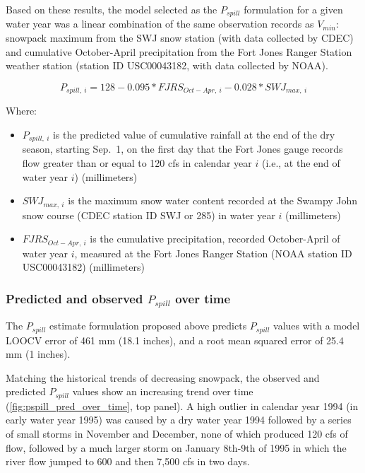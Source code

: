 \documentclass[hess, manuscript]{copernicus}
\providecommand{\tightlist}{%
  \setlength{\itemsep}{0pt}\setlength{\parskip}{0pt}}
\begin{document}
Based on these results, the model selected as the \(P_{spill}\)
formulation for a given water year was a linear combination of the same
observation records as \(V_{min}\): snowpack maximum from the SWJ snow
station (with data collected by CDEC) and cumulative October-April
precipitation from the Fort Jones Ranger Station weather station
(station ID USC00043182, with data collected by NOAA).

\begin{equation}
P_{spill,~i} = 128 -0.095 * FJRS_{Oct-Apr,~i} - 0.028* SWJ_{max,~i}
\end{equation}

Where:

\begin{itemize}
\tightlist
\item
  \(P_{spill,~i}\) is the predicted value of cumulative rainfall at the
  end of the dry season, starting Sep.~1, on the first day that the Fort
  Jones gauge records flow greater than or equal to 120 cfs in calendar
  year \(i\) (i.e., at the end of water year \(i\)) (millimeters)
\item
  \(SWJ_{max,~i}\) is the maximum snow water content recorded at the
  Swampy John snow course (CDEC station ID SWJ or 285) in water year
  \(i\) (millimeters)
\item
  \(FJRS_{Oct-Apr,~i}\) is the cumulative precipitation, recorded
  October-April of water year \(i\), measured at the Fort Jones Ranger
  Station (NOAA station ID USC00043182) (millimeters)
\end{itemize}

\subsubsection{\texorpdfstring{Predicted and observed \(P_{spill}\) over
time}{Predicted and observed P\_\{spill\} over time}}

The \(P_{spill}\) estimate formulation proposed above predicts
\(P_{spill}\) values with a model LOOCV error of 461 mm (18.1 inches),
and a root mean squared error of 25.4 mm (1 inches).

Matching the historical trends of decreasing snowpack, the observed and
predicted \(P_{spill}\) values show an increasing trend over time
(\autoref{fig:pspill_pred_over_time}, top panel). A high outlier in
calendar year 1994 (in early water year 1995) was caused by a dry water
year 1994 followed by a series of small storms in November and December,
none of which produced 120 cfs of flow, followed by a much larger storm
on January 8th-9th of 1995 in which the river flow jumped to 600 and
then 7,500 cfs in two days.
\end{document}
